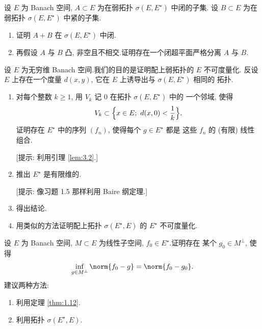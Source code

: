 \begin{exercise}
\label{exer:3.7}
设 $E$ 为 Banach 空间, $A\subset E$ 为在弱拓扑 $\sigma(E,E^\star)$ 中闭的子集.
设 $B\subset E$ 为在弱拓扑 $\sigma(E,E^\star)$ 中紧的子集.

\begin{enumerate}[label=\arabic*., leftmargin=2.2em, itemsep=0.25em]
	\item 证明 $A+B$ 在 $\sigma(E,E^\star)$ 中闭.
	\item 再假设 $A$ 与 $B$ 凸, 非空且不相交.证明存在一个闭超平面严格分离 $A$
	      与 $B$.
\end{enumerate}
\end{exercise}

\begin{exercise}
\label{exer:3.8}
设 $E$ 为无穷维 Banach 空间.我们的目的是证明配上弱拓扑的 $E$ 不可度量化.
反设 $E$ 上存在一个度量 $d(x,y)$, 它在 $E$ 上诱导出与 $\sigma(E,E^\star)$ 相同的
拓扑.

\begin{enumerate}[label=\arabic*., leftmargin=2.2em, itemsep=0.25em]
	\item 对每个整数 $k\ge1$, 用 $V_k$ 记 $0$ 在拓扑 $\sigma(E,E^\star)$ 中的
	      一个邻域, 使得
	      \begin{equation*}
	      V_k\subset\Bigl\{x\in E;\ d(x,0)<\frac1k\Bigr\}.
	      \end{equation*}
	      证明存在 $E^\star$ 中的序列 $(f_n)$, 使得每个 $g\in E^\star$ 都是
	      这些 $f_n$ 的 (有限) 线性组合.

	      [提示: 利用引理  \ref{lem:3.2}.]
	\item 推出 $E^\star$ 是有限维的.

	      [提示: 像习题 1.5 那样利用 Baire 纲定理.]
	\item 得出结论.
	\item 用类似的方法证明配上\wstar{}拓扑 $\sigma(E^\star,E)$ 的 $E^\star$
	      不可度量化.
\end{enumerate}
\end{exercise}

\begin{exercise}
\label{exer:3.9}
设 $E$ 为 Banach 空间, $M\subset E$ 为线性子空间, $f_0\in E^\star$.证明存在
某个 $g_0\in M^\perp$, 使得
\begin{equation*}
\inf_{g\in M^\perp}\norm{f_0-g}=\norm{f_0-g_0}.
\end{equation*}
建议两种方法:

\begin{enumerate}[label=\arabic*., leftmargin=2.2em, itemsep=0.25em]
	\item 利用定理  \ref{thm:1.12}.
	\item 利用\wstar{}拓扑 $\sigma(E^\star,E)$.
\end{enumerate}
\end{exercise}

